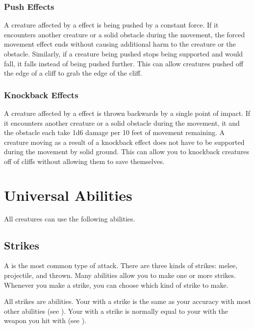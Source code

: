         \subsubsection{Push Effects}\label{Push Effects}
            A creature affected by a  effect is being pushed by a constant force.
            If it encounters another creature or a solid obstacle during the movement, the forced movement effect ends without causing additional harm to the creature or the obstacle.
            Similarly, if a creature being pushed stops being supported and would fall, it falls instead of being pushed further.
            This can allow creatures pushed off the edge of a cliff to grab the edge of the cliff.

        \subsubsection{Knockback Effects}\label{Knockback Effects}
            A creature affected by a  effect is thrown backwards by a single point of impact.
            If it encounters another creature or a solid obstacle during the movement, it and the obstacle each take 1d6 damage per 10 feet of movement remaining.
            A creature moving as a result of a knockback effect does not have to be supported during the movement by solid ground.
            This can allow you to knockback creatures off of cliffs without allowing them to save themselves.

\section{Universal Abilities}\label{Universal Abilities}
    All creatures can use the following abilities.

    \subsection{Strikes}\label{Strikes}
        A  is the most common type of attack.
        There are three kinds of strikes: melee, projectile, and thrown.
        Many abilities allow you to make one or more strikes.
        Whenever you make a strike, you can choose which kind of strike to make.

        All strikes are  abilities.
        Your  with a strike is the same as your accuracy with most other abilities (see ).
        Your  with a strike is normally equal to your  with the weapon you hit with (see ).

